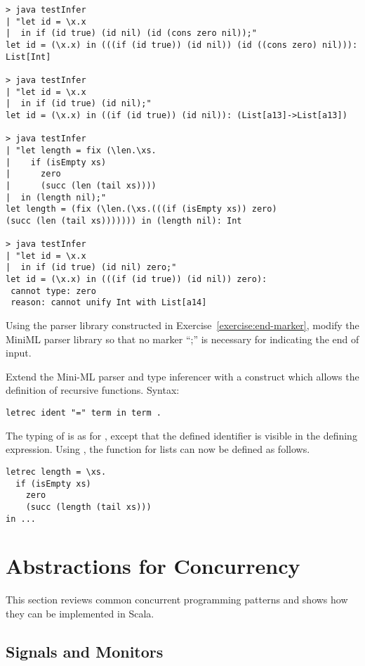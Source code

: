 {\begin{lstlisting}
> java testInfer 
| "let id = \x.x  
|  in if (id true) (id nil) (id (cons zero nil));"
let id = (\x.x) in (((if (id true)) (id nil)) (id ((cons zero) nil))): List[Int]

> java testInfer
| "let id = \x.x 
|  in if (id true) (id nil);"
let id = (\x.x) in ((if (id true)) (id nil)): (List[a13]->List[a13])

> java testInfer
| "let length = fix (\len.\xs.
|    if (isEmpty xs) 
|      zero 
|      (succ (len (tail xs))))
|  in (length nil);"
let length = (fix (\len.(\xs.(((if (isEmpty xs)) zero) 
(succ (len (tail xs))))))) in (length nil): Int

> java testInfer 
| "let id = \x.x 
|  in if (id true) (id nil) zero;"
let id = (\x.x) in (((if (id true)) (id nil)) zero): 
 cannot type: zero
 reason: cannot unify Int with List[a14]
\end{lstlisting}

\begin{exercise}\label{exercise:hm-parse} Using the parser library constructed in
Exercise~\ref{exercise:end-marker}, modify the MiniML parser library
so that no marker ``;'' is necessary for indicating the end of input.
\end{exercise}

\begin{exercise}\label{execcise:hm-extend} Extend the Mini-ML parser and type
inferencer with a  construct which allows the definition of
recursive functions. Syntax:
\begin{lstlisting}
letrec ident "=" term in term .
\end{lstlisting}
The typing of  is as for , 
except that the defined identifier is visible in the defining expression. Using , the  function for lists can now be defined as follows.
\begin{lstlisting}
letrec length = \xs.
  if (isEmpty xs)
    zero
    (succ (length (tail xs)))
in ...
\end{lstlisting}
\end{exercise}

\chapter{Abstractions for Concurrency}\label{sec:ex-concurrency}

This section reviews common concurrent programming patterns and shows
how they can be implemented in Scala.

\section{Signals and Monitors}

}

